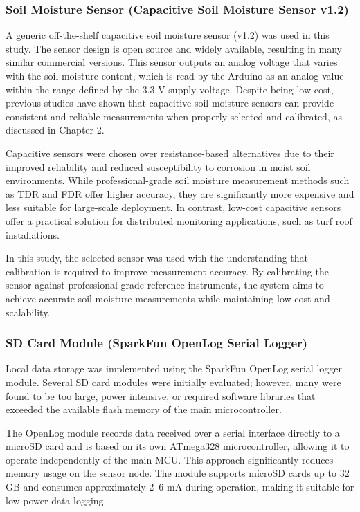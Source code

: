\subsubsection{Soil Moisture Sensor (Capacitive Soil Moisture
Sensor
v1.2)}

A generic off-the-shelf capacitive soil moisture sensor (v1.2) was used
in this study. The sensor design is open source and widely available,
resulting in many similar commercial versions. This sensor outputs an
analog voltage that varies with the soil moisture content, which is read
by the Arduino as an analog value within the range defined by the 3.3 V
supply voltage. Despite being low cost, previous studies have shown that
capacitive soil moisture sensors can provide consistent and reliable
measurements when properly selected and calibrated, as discussed in
Chapter 2.

Capacitive sensors were chosen over resistance-based alternatives due to
their improved reliability and reduced susceptibility to corrosion in
moist soil environments. While professional-grade soil moisture
measurement methods such as TDR and FDR offer higher accuracy, they are
significantly more expensive and less suitable for large-scale
deployment. In contrast, low-cost capacitive sensors offer a practical
solution for distributed monitoring applications, such as turf roof
installations.

In this study, the selected sensor was used with the understanding that
calibration is required to improve measurement accuracy. By calibrating
the sensor against professional-grade reference instruments, the system
aims to achieve accurate soil moisture measurements while maintaining
low cost and scalability.

\subsubsection{SD Card Module (SparkFun OpenLog Serial
Logger)}

Local data storage was implemented using the SparkFun OpenLog
serial logger module. Several SD card modules were initially evaluated;
however, many were found to be too large, power intensive, or required
software libraries that exceeded the available flash memory of the main
microcontroller.


The OpenLog module records data received over a serial
interface directly to a microSD card and is based on its own ATmega328
microcontroller, allowing it to operate independently of the main MCU.
This approach significantly reduces memory usage on the sensor node. The
module supports microSD cards up to 32 GB and consumes approximately
2--6 mA during operation, making it suitable for low-power data
logging.


